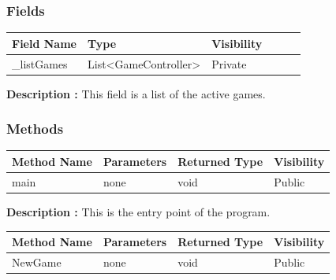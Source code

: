 \documentclass[12pt]{article}
\begin{document}
\subsubsection{Fields}

\begin{table}[H]
    \begin{tabular}{llllll}
    \hline
    \multicolumn{1}{|l|}{\cellcolor[HTML]{EFEFEF}\textbf{Field Name}} & \multicolumn{1}{l|}{\cellcolor[HTML]{EFEFEF}\textbf{Type}} & \multicolumn{1}{l|}{\cellcolor[HTML]{EFEFEF}\textbf{Visibility}} \\ \hline
    \multicolumn{1}{|l|}{\_listGames}                                 & \multicolumn{1}{l|}{List\textless{}GameController\textgreater{}}                                & \multicolumn{1}{l|}{Private}                                     \\ \hline
    \end{tabular}
\end{table}

\textbf{Description :} This field is a list of the active games.

\subsubsection{Methods}

\begin{table}[H]
    \begin{tabular}{|l|l|l|l|}
    \hline
    \rowcolor[HTML]{EFEFEF} 
    \cellcolor[HTML]{EFEFEF}\textbf{Method Name} & \textbf{Parameters}    & \textbf{Returned Type} & \textbf{Visibility} \\ \hline
    main                                         & none                   & void                   & Public              \\ \hline
    \end{tabular}
\end{table}

\textbf{Description :} This is the entry point of the program.

\begin{table}[H]
    \begin{tabular}{|l|l|l|l|}
    \hline
    \rowcolor[HTML]{EFEFEF} 
    \cellcolor[HTML]{EFEFEF}\textbf{Method Name} & \textbf{Parameters}    & \textbf{Returned Type} & \textbf{Visibility} \\ \hline
    NewGame                                      & none                   & void                   & Public              \\ \hline
    \end{tabular}
\end{table}
\end{document}
